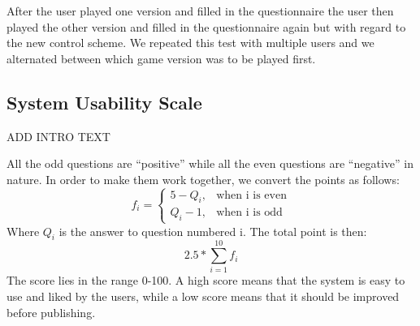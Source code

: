 After the user played one version and filled in the questionnaire the user then played the other version and filled in the questionnaire again but with regard to the new control scheme. We repeated this test with multiple users and we alternated between which game version was to be played first.

\subsection{System Usability Scale}
ADD INTRO TEXT

All the odd questions are ``positive'' while all the even questions are ``negative'' in nature. In order to make them work together, we convert the points as follows: 
\[
    f_{i} = 
\begin{cases}
    5 - Q_{i}, & \text{when i is even}\\
    Q_{i} - 1, & \text{when i is odd}
\end{cases}
\]
Where \(Q_{i} \) is the answer to question numbered i. The total point is then: 
\[ 2.5 * \displaystyle \sum_{i=1}^{10} f_{i} \]
The score lies in the range 0-100. A high score means that the system is easy to use and liked by the users, while a low score means that it should be improved before publishing. \citep{Broo}
